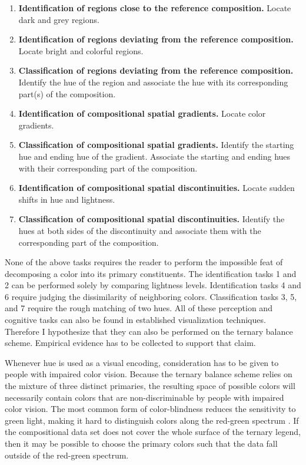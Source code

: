 \documentclass[10pt,twoside,reqno]{article}
\providecommand{\tightlist}{%
  \setlength{\topsep}{0pt}
  \setlength{\partopsep}{0pt}
  \setlength{\itemsep}{0pt}
  \setlength{\parsep}{.9\parskip}
}
\begin{document}
\begin{enumerate}
\def\labelenumi{\arabic{enumi}.}
\tightlist
\item
  \textbf{Identification of regions close to the reference composition.}
  Locate dark and grey regions.
\item
  \textbf{Identification of regions deviating from the reference
  composition.} Locate bright and colorful regions.
\item
  \textbf{Classification of regions deviating from the reference
  composition.} Identify the hue of the region and associate the hue
  with its corresponding part(s) of the composition.
\item
  \textbf{Identification of compositional spatial gradients.} Locate
  color gradients.
\item
  \textbf{Classification of compositional spatial gradients.} Identify
  the starting hue and ending hue of the gradient. Associate the
  starting and ending hues with their corresponding part of the
  composition.
\item
  \textbf{Identification of compositional spatial discontinuities.}
  Locate sudden shifts in hue and lightness.
\item
  \textbf{Classification of compositional spatial discontinuities.}
  Identify the hues at both sides of the discontinuity and associate
  them with the corresponding part of the composition.
\end{enumerate}

None of the above tasks requires the reader to perform the impossible
feat of decomposing a color into its primary constituents. The
identification tasks 1 and 2 can be performed solely by comparing
lightness levels. Identification tasks 4 and 6 require judging the
dissimilarity of neighboring colors. Classification tasks 3, 5, and 7
require the rough matching of two hues. All of these perception and
cognitive tasks can also be found in established visualization
techniques. Therefore I hypothesize that they can also be performed on
the ternary balance scheme. Empirical evidence has to be collected to
support that claim.

Whenever hue is used as a visual encoding, consideration has to be given
to people with impaired color vision. Because the ternary balance scheme
relies on the mixture of three distinct primaries, the resulting space
of possible colors will necessarily contain colors that are
non-discriminable by people with impaired color vision. The most common
form of color-blindness reduces the sensitivity to green light, making
it hard to distinguish colors along the red-green spectrum
\citep{Birch2012}. If the compositional data set does not cover the
whole surface of the ternary legend, then it may be possible to choose
the primary colors such that the data fall outside of the red-green
spectrum.
\end{document}
